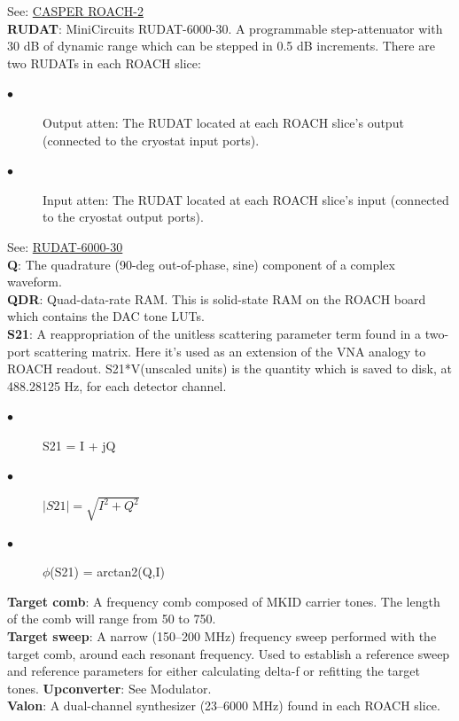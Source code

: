 See: \href{https://casper.ssl.berkeley.edu/wiki/ROACH-2_Revision_2}{CASPER ROACH-2}\\
\textbf{RUDAT}: MiniCircuits RUDAT-6000-30. A programmable step-attenuator with 30 dB of dynamic range which can be stepped in 0.5 dB increments. There are two RUDATs in each ROACH slice:
\begin{description}
  \item[$\bullet$] Output atten: The RUDAT located at each ROACH slice’s output (connected to the cryostat input ports).
  \item[$\bullet$] Input atten: The RUDAT located at each ROACH slice’s input (connected to the cryostat output ports).
\end{description}
See: \href{https://www.minicircuits.com/pdfs/RUDAT-6000-30.pdf}{RUDAT-6000-30}\\
\textbf{Q}: The quadrature (90-deg out-of-phase, sine) component of a complex waveform.\\
\textbf{QDR}: Quad-data-rate RAM. This is solid-state RAM on the ROACH board which contains the DAC tone LUTs.\\
\textbf{S21}: A reappropriation of the unitless scattering parameter term found in a two-port scattering matrix. Here it’s used as an extension of the VNA analogy to ROACH readout. S21*V(unscaled units) is the quantity which is saved to disk, at 488.28125 Hz, for each detector channel.
\begin{description}
  \item[$\bullet$] S21 = I + jQ
  \item[$\bullet$] $\left|S21\right| = \sqrt{I^{2} + Q^{2}}$
  \item[$\bullet$] $\phi$(S21) = arctan2(Q,I)
\end{description}
\textbf{Target comb}: A frequency comb composed of MKID carrier tones. The length of the comb will range from 50 to 750.\\
\textbf{Target sweep}: A narrow (150--200 MHz) frequency sweep performed with the target comb, around each resonant frequency. Used to establish a reference sweep and reference parameters for either calculating delta-f or refitting the target tones.
\textbf{Upconverter}: See Modulator.\\
\textbf{Valon}: A dual-channel synthesizer (23--6000 MHz) found in each ROACH slice.\\
